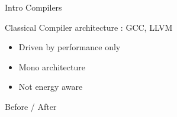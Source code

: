 %
\begin{Frame}{Intro Compilers}
      \begin{block}{Classical Compiler architecture : GCC, LLVM}
        \begin{itemize}
        \item Driven by performance only
        \item Mono architecture
        \item Not energy aware
        \end{itemize}
      \end{block} 
      \begin{block}{Before / After}
      \end{block}   
\end{Frame}



